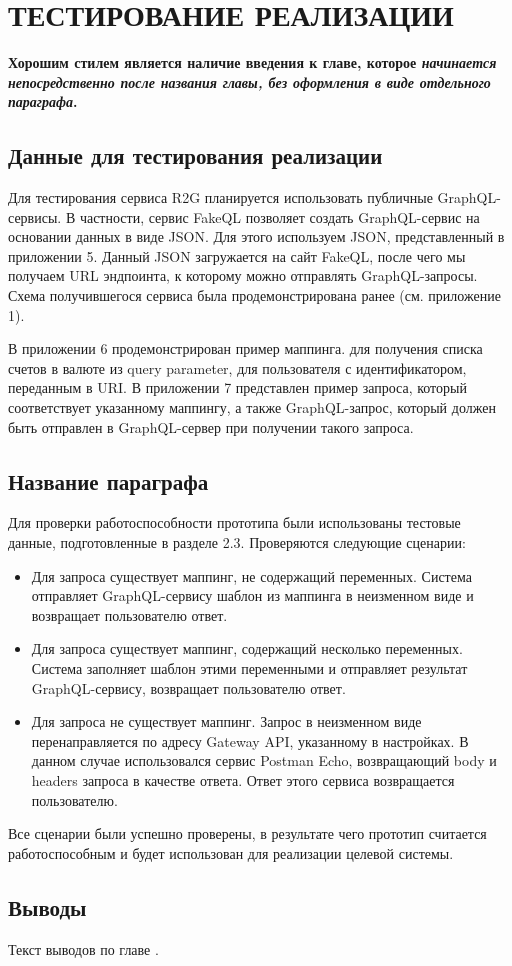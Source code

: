 \chapter{ТЕСТИРОВАНИЕ РЕАЛИЗАЦИИ} \label{ch4}

\textbf{Хорошим стилем является наличие введения к главе, которое \textit{начинается непосредственно после названия главы, без оформления в виде отдельного параграфа}.}

\section{Данные для тестирования реализации}\label{sec:testing-data}

Для тестирования сервиса R2G планируется использовать публичные GraphQL-сервисы.
В частности, сервис FakeQL позволяет создать GraphQL-сервис на основании данных в виде JSON. Для этого используем JSON, представленный в приложении 5.
Данный JSON загружается на сайт FakeQL, после чего мы получаем URL эндпоинта, к которому можно отправлять GraphQL-запросы.
Схема получившегося сервиса была продемонстрирована ранее (см. приложение 1).

В приложении 6 продемонстрирован пример маппинга.
для получения списка счетов в валюте из query parameter, для пользователя с идентификатором, переданным в URI. В приложении 7 представлен пример запроса, который соответствует указанному маппингу, а также GraphQL-запрос, который должен быть отправлен в GraphQL-сервер при получении такого запроса.

\section{Название параграфа} \label{ch4:sec1}

Для проверки работоспособности прототипа были использованы тестовые данные, подготовленные в разделе 2.3. Проверяются следующие сценарии:

\begin{itemize}
	\item Для запроса существует маппинг, не содержащий переменных.
	Система отправляет GraphQL-сервису шаблон из маппинга в неизменном виде и возвращает пользователю ответ.

	\item Для запроса существует маппинг, содержащий несколько переменных.
	Система заполняет шаблон этими переменными и отправляет результат GraphQL-сервису, возвращает пользователю ответ.

    \item Для запроса не существует маппинг.
	Запрос в неизменном виде перенаправляется по адресу Gateway API, указанному в настройках.
	В данном случае использовался сервис Postman Echo, возвращающий body и headers запроса в качестве ответа.
	Ответ этого сервиса возвращается пользователю.
\end{itemize}

Все сценарии были успешно проверены, в результате чего прототип считается работоспособным и будет использован для реализации целевой системы.


\section{Выводы} \label{ch4:conclusion}

Текст выводов по главе \thechapter.

